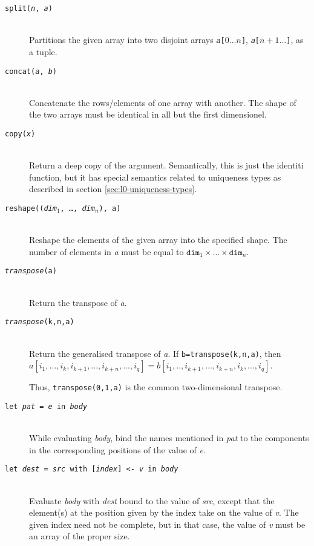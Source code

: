 \documentclass[oneside]{memoir}
\begin{document}
\begin{description}
  \item[\texttt{split(\textit{n}, \textit{a})}]\hfill\\
    Partitions the given array into two disjoint arrays
    \texttt{\textit{a}[$0\ldots{}n$]}, \texttt{\textit{a}[$n+1\ldots{}$]}, as a tuple.

  \item[\texttt{concat(\textit{a}, \textit{b})}]\hfill\\
    Concatenate the rows/elements of one array with another.  The
    shape of the two arrays must be identical in all but the first
    dimensionel.

  \item[\texttt{copy(\textit{x})}]\hfill\\
    Return a deep copy of the argument.  Semantically, this is just
    the identiti function, but it has special semantics related to
    uniqueness types as described in section
    \ref{sec:l0-uniqueness-types}.

  \item[\texttt{reshape((\textit{dim}$_{1}$, \ldots, \textit{dim}$_{n}$), a)}]\hfill\\
    Reshape the elements of the given array into the specified shape.
    The number of elements in \textit{a} must be equal to
    $\texttt{dim}_{1}\times\ldots\times\texttt{dim}_{n}$.

  \item[\texttt{\textit{transpose}(a)}]\hfill\\
    Return the transpose of \textit{a}.

  \item[\texttt{\textit{transpose}(k,n,a)}]\hfill\\
    Return the generalised transpose of \textit{a}.  If
    \texttt{b=transpose(k,n,a)}, then $a[i_1, ..., i_k, i_{k+1}, ...,
    i_{k+n}, ..., i_q ] = b[i_1 ,.., i_{k+1} , ..., i_{k+n}, i_k, ...,
    i_q ]$.

    Thus, \texttt{transpose(0,1,a)} is the common two-dimensional
    transpose.

  \item[\texttt{let \textit{pat} = \textit{e} in \textit{body}}]\hfill\\
    While evaluating \textit{body}, bind the names mentioned in
    \textit{pat} to the components in the corresponding positions of
    the value of \textit{e}.

  \item[\texttt{let \textit{dest} = \textit{src} with [\textit{index}] <- \textit{v} in \textit{body}}] \hfill \\
    Evaluate \textit{body} with \textit{dest} bound to the value of
    \textit{src}, except that the element(s) at the position given by
    the index take on the value of \textit{v}.  The given index need
    not be complete, but in that case, the value of \textit{v} must be
    an array of the proper size.


\end{description}
\end{document}
